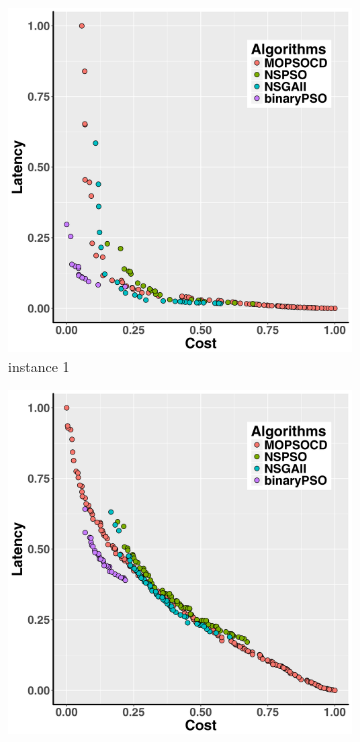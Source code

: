 \documentclass[10pt,journal,compsoc]{IEEEtran}
\begin{document}
\begin{figure}[ht]
   \caption{MOPSOCD, BNSPSO, NSGA-II, and BPSO Experiments: The non-dominated solutions
among the sets obtained by 40 independent runs of different algorithms}
   \centering
   \begin{subfigure}{0.21\linewidth}
       \includegraphics[width=\textwidth]{pics/total1.png}
    \caption{instance 1}
   \end{subfigure}
   \begin{subfigure}{0.21\linewidth}
       \includegraphics[width=\textwidth]{pics/total2.png}

\end{subfigure}
\end{figure}
\end{document}
